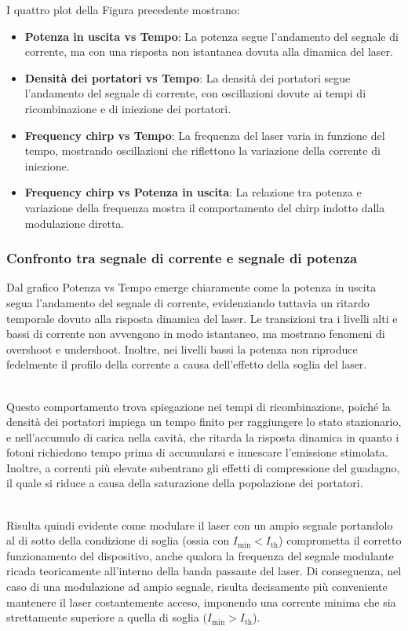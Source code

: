 I quattro plot della Figura precedente mostrano:
\begin{itemize}
    \item \textbf{Potenza in uscita vs Tempo}: La potenza segue l'andamento del segnale di corrente, ma con una risposta non istantanea dovuta alla dinamica del laser.
    \item \textbf{Densità dei portatori vs Tempo}: La densità dei portatori segue l'andamento del segnale di corrente, con oscillazioni dovute ai tempi di ricombinazione e
    di iniezione dei portatori.
    \item \textbf{Frequency chirp vs Tempo}: La frequenza del laser varia in funzione del tempo, mostrando oscillazioni che riflettono la variazione della corrente
    di iniezione.
    \item \textbf{Frequency chirp vs Potenza in uscita}: La relazione tra potenza e variazione della frequenza mostra il comportamento del chirp indotto dalla modulazione
    diretta.
\end{itemize}

\subsubsection{Confronto tra segnale di corrente e segnale di potenza}
\noindent Dal grafico Potenza vs Tempo emerge chiaramente come la potenza in uscita segua l'andamento del segnale di corrente, evidenziando tuttavia un ritardo temporale
dovuto alla risposta dinamica del laser. Le transizioni tra i livelli alti e bassi di corrente non avvengono in modo istantaneo, ma mostrano fenomeni di overshoot e
undershoot. Inoltre, nei livelli bassi la potenza non riproduce fedelmente il profilo della corrente a causa dell'effetto della soglia del laser.

\noindent\\ Questo comportamento trova spiegazione nei tempi di ricombinazione, poiché la densità dei portatori impiega un tempo finito per raggiungere lo stato stazionario,
e nell'accumulo di carica nella cavità, che ritarda la risposta dinamica in quanto i fotoni richiedono tempo prima di accumularsi e innescare l'emissione stimolata.
Inoltre, a correnti più elevate subentrano gli effetti di compressione del guadagno, il quale si riduce a causa della saturazione della popolazione dei portatori.

\noindent\\ Risulta quindi evidente come modulare il laser con un ampio segnale portandolo al di sotto della condizione di soglia (ossia con $I_{\text{min}} < I_{\text{th}}$)
comprometta il corretto funzionamento del dispositivo, anche qualora la frequenza del segnale modulante ricada teoricamente all'interno della banda passante del laser.
Di conseguenza, nel caso di una modulazione ad ampio segnale, risulta decisamente più conveniente mantenere il laser costantemente acceso, imponendo una corrente minima
che sia strettamente superiore a quella di soglia ($I_{\text{min}} > I_{\text{th}}$).

